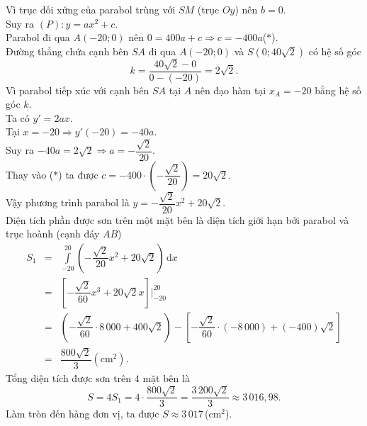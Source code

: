\begin{ex}
{{}
		\noindent
		Vì trục đối xứng của parabol trùng với $SM$ (trục $Oy$) nên $b = 0$.\\ Suy ra $(P)\colon y = ax^2 + c$.\\
		Parabol đi qua $A(-20;0)$ nên $0 = 400a + c \Rightarrow c = -400a$\quad($\ast$).\\
		Đường thẳng chứa cạnh bên $SA$ đi qua $A(-20;0)$ và $S(0; 40\sqrt{2})$ có hệ số góc
		\[k = \dfrac{40\sqrt{2} - 0}{0 - (-20)} = 2\sqrt{2}.\]
		Vì parabol tiếp xúc với cạnh bên $SA$ tại $A$ nên đạo hàm tại $x_A = -20$ bằng hệ số góc $k$.\\
		Ta có $y' = 2ax$.\\
		Tại $x = -20 \Rightarrow y'(-20) = -40a$.\\
		Suy ra $-40a = 2\sqrt{2} \Rightarrow a = -\dfrac{\sqrt{2}}{20}$.\\
		Thay vào ($\ast$) ta được $c = -400 \cdot \left(-\dfrac{\sqrt{2}}{20}\right) = 20\sqrt{2}$.\\
		Vậy phương trình parabol là $y = -\dfrac{\sqrt{2}}{20}x^2 + 20\sqrt{2}$.\\
		Diện tích phần được sơn trên một mặt bên là diện tích giới hạn bởi parabol và trục hoành (cạnh đáy $AB$)
		\allowdisplaybreaks
		\begin{eqnarray*}
			S_1
			&=& \displaystyle\int\limits_{-20}^{20} \left(-\dfrac{\sqrt{2}}{20}x^2 + 20\sqrt{2}\right) \,\mathrm{d}x \\
			&=& \left[ -\dfrac{\sqrt{2}}{60}x^3 + 20\sqrt{2}x \right]\Bigg|_{-20}^{20} \\
			&=& \left( -\dfrac{\sqrt{2}}{60} \cdot 8\,000 + 400\sqrt{2} \right) - \left[-\dfrac{\sqrt{2}}{60} \cdot (-8\,000) + (-400)\sqrt{2} \right]\\
			&=& \dfrac{800\sqrt{2}}{3} \left(\mathrm{cm}^2\right).
		\end{eqnarray*}
		Tổng diện tích được sơn trên $4$ mặt bên là
		\[S = 4 S_1 = 4 \cdot \dfrac{800\sqrt{2}}{3} = \dfrac{3\,200\sqrt{2}}{3} \approx 3\,016{,}98.\]
		Làm tròn đến hàng đơn vị, ta được $S \approx 3\,017$\,(cm$^2$).
	}
\end{ex}

